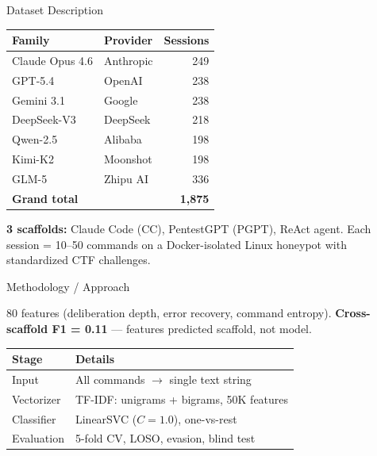 \documentclass[final]{beamer}
\newlength{\colwidth}
\begin{document}
\begin{frame}[t]
\begin{columns}[t]
\begin{column}{\colwidth}
\begin{block}{Dataset Description}
    \begin{table}
      \centering
      \begin{tabular}{l l r}
        \toprule
        \textbf{Family} & \textbf{Provider} & \textbf{Sessions} \\
        \midrule
        Claude Opus 4.6 & Anthropic  & 249 \\
        GPT-5.4         & OpenAI     & 238 \\
        Gemini 3.1      & Google     & 238 \\
        DeepSeek-V3     & DeepSeek   & 218 \\
        Qwen-2.5        & Alibaba    & 198 \\
        Kimi-K2         & Moonshot   & 198 \\
        GLM-5           & Zhipu AI   & 336 \\
        \midrule
        \multicolumn{2}{l}{\textbf{Grand total}} & \textbf{1,875} \\
        \bottomrule
      \end{tabular}
    \end{table}

    \textbf{3 scaffolds:} Claude Code (CC), PentestGPT (PGPT), ReAct agent.
    Each session = 10--50 commands on a Docker-isolated Linux honeypot
    with standardized CTF challenges.

  \end{block}

  \begin{block}{Methodology / Approach}


    80 features (deliberation depth, error recovery, command entropy).
    \textbf{Cross-scaffold F1 = 0.11} --- features predicted scaffold, not model.


    \begin{table}
      \centering
      \begin{tabular}{l l}
        \toprule
        \textbf{Stage} & \textbf{Details} \\
        \midrule
        Input & All commands $\rightarrow$ single text string \\
        Vectorizer & TF-IDF: unigrams + bigrams, 50K features \\
        Classifier & LinearSVC ($C=1.0$), one-vs-rest \\
        Evaluation & 5-fold CV, LOSO, evasion, blind test \\
        \bottomrule
      \end{tabular}
    \end{table}


\end{block}
\end{column}
\end{columns}
\end{frame}
\end{document}
